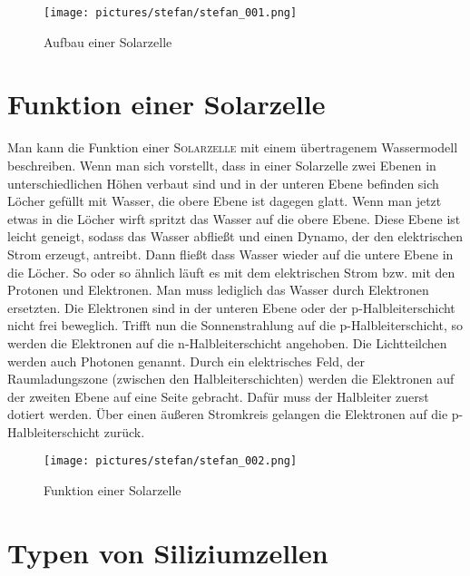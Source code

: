 \documentclass[12pt]{scrbook}
\begin{document}
\begin{figure}[htbp] 
  \centering
     \texttt{[image: pictures/stefan/stefan\_001.png]}
  \caption{Aufbau einer Solarzelle}
  \label{pic:Aufbau Solarzelle}
\end{figure}

\newpage


\section{Funktion einer Solarzelle}

Man kann die Funktion einer \textsc{Solarzelle} mit einem übertragenem Wassermodell
beschreiben. Wenn man sich vorstellt, dass in einer Solarzelle zwei Ebenen in
unterschiedlichen Höhen verbaut sind und in der unteren Ebene befinden sich
Löcher gefüllt mit Wasser, die obere Ebene ist dagegen glatt. Wenn man jetzt
etwas in die Löcher wirft spritzt das Wasser auf die obere Ebene. Diese Ebene
ist leicht geneigt, sodass das Wasser abfließt und einen Dynamo, der den
elektrischen Strom erzeugt, antreibt. Dann fließt dass Wasser wieder auf die
untere Ebene in die Löcher. So oder so ähnlich läuft es mit dem elektrischen
Strom bzw. mit den Protonen und Elektronen. Man muss lediglich das Wasser
durch Elektronen ersetzten. Die Elektronen sind in der unteren Ebene oder der
p-Halbleiterschicht nicht frei beweglich. Trifft nun die Sonnenstrahlung auf
die p-Halbleiterschicht, so werden die Elektronen auf die n-Halbleiterschicht
angehoben. Die Lichtteilchen werden auch Photonen genannt. Durch ein
elektrisches Feld, der Raumladungszone (zwischen den Halbleiterschichten)
werden die Elektronen auf der zweiten Ebene auf eine Seite gebracht. Dafür
muss der Halbleiter zuerst dotiert werden. Über einen äußeren Stromkreis
gelangen die Elektronen auf die p-Halbleiterschicht zurück.


\begin{figure}[htbp] 
  \centering
     \texttt{[image: pictures/stefan/stefan\_002.png]}
  \caption{Funktion einer Solarzelle}
  \label{pic:Funktion Solarzelle}
\end{figure}


\newpage

\section{Typen von Siliziumzellen}
\end{document}
